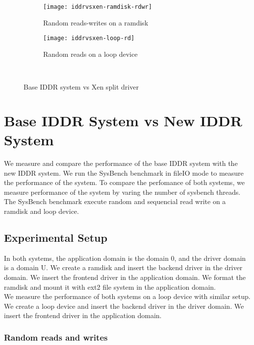 \begin{figure}[!ht]
  \begin{subfigure}[b]{0.2\textwidth}
  \texttt{[image: iddrvsxen-ramdisk-rdwr]}
  \caption{Random reads-writes on a ramdisk}
  \label{fig:iddrvsxen-ramdisk-rdwr}
  \end{subfigure}
  \hspace{50mm}
  \begin{subfigure}[b]{0.2\textwidth}
  \texttt{[image: iddrvsxen-loop-rd]}
  \caption{Random reads on a loop device}
  \label{fig:iddrvsxen-loop-rd}
  \end{subfigure}\\
\caption{Base IDDR system vs Xen split driver}\label{fig:seqloopdisk}
\end{figure}

\section{Base IDDR System vs New IDDR System}
We measure and compare the performance of the base IDDR system with the new IDDR system. We run the SysBench benchmark in fileIO mode to measure the performance of the system. To compare the perfomance of both systems, we measure performance of the system by varing the number of sysbench threads. The SysBench benchmark execute random and sequencial read write on a ramdisk and loop device. 
\subsection*{Experimental Setup}
In both systems, the application domain is the domain 0, and the driver domain is a domain U. We create a ramdisk and insert the backend driver in the driver domain. We insert the frontend driver in the application domain. We format the ramdisk and mount it with ext2 file system in the application domain. 
\\[3mm]
We measure the performance of both systems on a loop device with similar setup. We create a loop device and insert the backend driver in the driver domain. We insert the frontend driver in the application domain. %

\subsubsection*{Random reads and writes}

